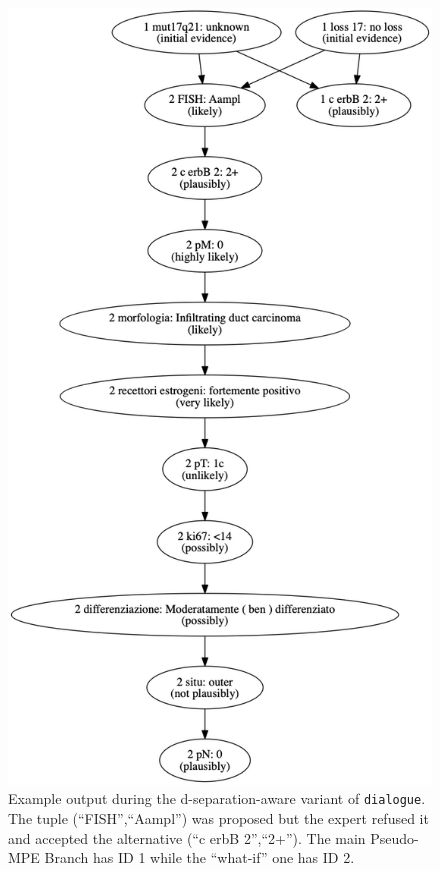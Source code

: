 \begin{figure}[htbp]
\centerline{\includegraphics[scale=0.2]{methodology/images/alternative-explanation-tree-example}}
\caption{Example output during the d-separation-aware variant of \texttt{dialogue}.
	The tuple (\enquote{FISH},\enquote{Aampl}) was proposed but the expert refused it and accepted the alternative (\enquote{c erbB 2},\enquote{2+}).
	The main Pseudo-MPE Branch has ID 1 while the \enquote{what-if} one has ID 2.}
\label{fig:alternative-branch}
\end{figure}

